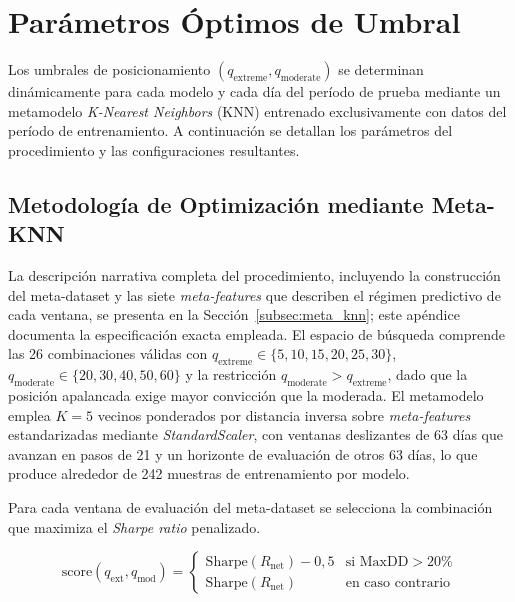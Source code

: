 
\section{Par\'ametros \'Optimos de Umbral}
\label{app:optimal_params}

Los umbrales de posicionamiento $(q_{\text{extreme}}, q_{\text{moderate}})$ se determinan din\'amicamente para cada modelo y cada d\'ia del per\'iodo de prueba mediante un metamodelo \textit{K-Nearest Neighbors} (KNN) entrenado exclusivamente con datos del per\'iodo de entrenamiento. A continuaci\'on se detallan los par\'ametros del procedimiento y las configuraciones resultantes.

\subsection{Metodolog\'ia de Optimizaci\'on mediante Meta-KNN}
\label{app:opt_methodology}

La descripci\'on narrativa completa del procedimiento, incluyendo la construcci\'on del meta-dataset y las siete \textit{meta-features} que describen el r\'egimen predictivo de cada ventana, se presenta en la Secci\'on~\ref{subsec:meta_knn}; este ap\'endice documenta la especificaci\'on exacta empleada. El espacio de b\'usqueda comprende las 26 combinaciones v\'alidas con $q_{\text{extreme}} \in \{5, 10, 15, 20, 25, 30\}$, $q_{\text{moderate}} \in \{20, 30, 40, 50, 60\}$ y la restricci\'on $q_{\text{moderate}} > q_{\text{extreme}}$, dado que la posici\'on apalancada exige mayor convicci\'on que la moderada. El metamodelo emplea $K = 5$ vecinos ponderados por distancia inversa sobre \textit{meta-features} estandarizadas mediante \textit{StandardScaler}, con ventanas deslizantes de 63 d\'ias que avanzan en pasos de 21 y un horizonte de evaluaci\'on de otros 63 d\'ias, lo que produce alrededor de 242 muestras de entrenamiento por modelo.

Para cada ventana de evaluaci\'on del meta-dataset se selecciona la combinaci\'on que maximiza el \textit{Sharpe ratio} penalizado.

\begin{equation}
\text{score}(q_{\text{ext}}, q_{\text{mod}}) =
\begin{cases}
\text{Sharpe}(R_{\text{net}}) - 0{,}5 & \text{si } \text{MaxDD} > 20\% \\[4pt]
\text{Sharpe}(R_{\text{net}}) & \text{en caso contrario}
\end{cases}
\end{equation}

